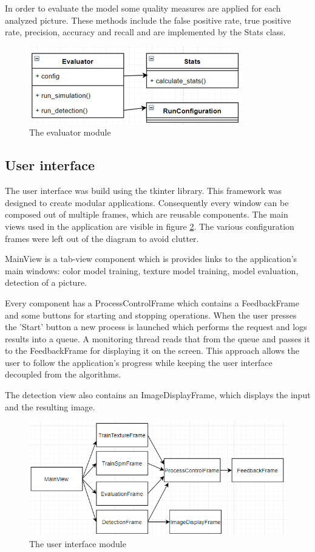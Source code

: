 \documentclass[12pt]{report}
\begin{document}
	In order to evaluate the model some quality measures are applied for each analyzed picture. These methods include the false positive rate, true positive rate, precision, accuracy and recall and are implemented by the Stats class.
	
	\begin{figure}[h!]
		\centering
		\includegraphics[]{design/evaluator.png}
		\caption{The evaluator module}
		\label{fig:evaluator}
	\end{figure}
	
	\subsection{User interface}
	
	The user interface was build using the tkinter library. This framework was designed to create modular applications. Consequently every window can be composed out of multiple frames, which are reusable components. The main views used in the application are visible in figure \ref{fig:gui}. The various configuration frames were left out of the diagram to avoid clutter.
	
	MainView is a tab-view component which is provides links to the application's main windows: color model training, texture model training, model evaluation, detection of a picture.
	
	Every component has a ProcessControlFrame which contains a FeedbackFrame and some buttons for starting and stopping operations. When the user presses the 'Start' button a new process is launched which performs the request and logs results into a queue. A monitoring thread reads that from the queue and passes it to the FeedbackFrame for displaying it on the screen. This approach allows the user to follow the application's progress while keeping the user interface decoupled from the algorithms.
	
	The detection view also contains an ImageDisplayFrame, which displays the input and the resulting image.
	
	\begin{figure}[h!]
		\centering
		\includegraphics[]{design/gui.png}
		\caption{The user interface module}
		\label{fig:gui}
	\end{figure}
	
\end{document}
